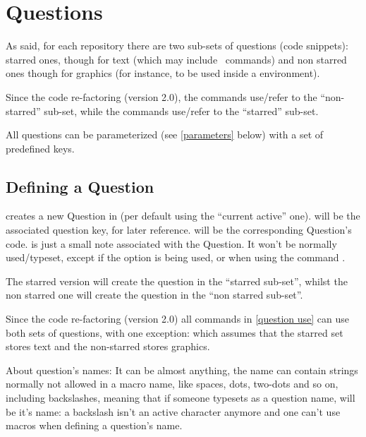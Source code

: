 \documentclass[10pt]{article}
\begin{document}
\section{Questions}
As said, for each repository there are two sub-sets of questions (code snippets): starred ones, though for text (which may include \LaTeXe\ commands) and non starred ones though for graphics (for instance, to be used inside a  environment). 

Since the code re-factoring (version 2.0), the commands  use/refer to the ``non-starred'' sub-set, while the commands  use/refer to the ``starred'' sub-set.

 All questions can be parameterized (see \ref{parameters} below) with a set of predefined keys.

\subsection{Defining a Question}\label{question definition}
\begin{codedescribe}{}
\begin{codesyntax}%
\end{codesyntax}
 creates a new Question in  (per default using the ``current active'' one).  will be the associated question key, for later reference.  will be the corresponding Question's code.  is just a small note associated with the Question. It won't be normally used/typeset, except if the  option is being used, or when using the command \tsobj{\QuestionsList}.

The starred version  will create the question in the ``starred sub-set'', whilst the non starred one  will create the question in the ``non starred sub-set''. 
\end{codedescribe}
\begin{tsremark}
  Since the code re-factoring (version 2.0) all commands in \ref{question use} can use both sets of questions, with one exception: \tsobj{\QuestionsList} which assumes that the starred set stores text and the non-starred stores  graphics.
\end{tsremark}
\begin{tsremark}
About question's names: It can be almost anything, the name can contain strings normally not allowed in a macro name, like spaces, dots, two-dots and so on, including backslashes, meaning that if someone typesets \tsobj{\XYZ} as a question name, \tsobj{\XYZ} will be it's name: a backslash isn't an active character anymore and one can't use macros when defining a question's name.
\end{tsremark}
\end{document}
